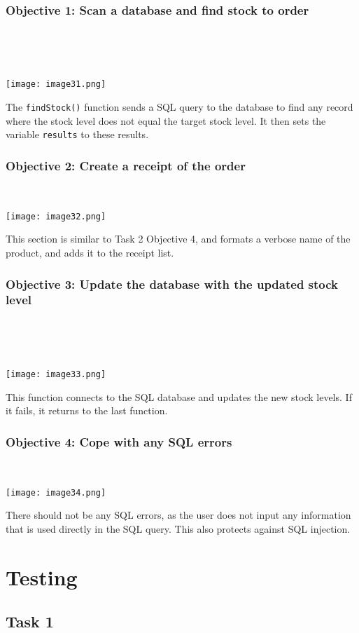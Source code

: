 \documentclass[a4paper]{article}
\begin{document}
\subsubsection{Objective 1: Scan a database and find stock to order} ~\par ~\par
\noindent\texttt{[image: image31.png]} \par 
The \verb|findStock()| function sends a SQL query to the database to find any record where the stock level does not equal the target stock level. It then sets the variable \verb?results? to these results.
\subsubsection{Objective 2: Create a receipt of the order} ~\par
\noindent\texttt{[image: image32.png]} \par 
This section is similar to Task 2 Objective 4, and formats a verbose name of the product, and adds it to the receipt list.
\subsubsection{Objective 3: Update the database with the updated stock level} ~\par ~\par
\noindent\texttt{[image: image33.png]} \par 
This function connects to the SQL database and updates the new stock levels. If it fails, it returns to the last function. 
\subsubsection{Objective 4: Cope with any SQL errors} ~\par
\noindent\texttt{[image: image34.png]} \par 
There should not be any SQL errors, as the user does not input any information that is used directly in the SQL query. This also protects against SQL injection.

\newpage

\section{Testing}
\subsection{Task 1}
\end{document}
